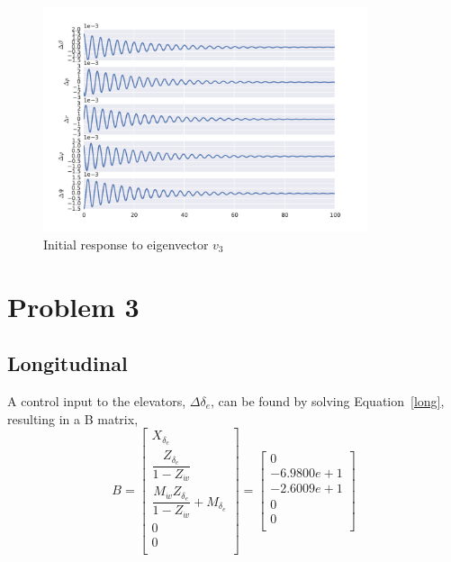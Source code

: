 \documentclass[12pt]{article}
\begin{document}
\begin{figure}[h]
\begin{center}
\includegraphics[width=0.85\textwidth]{figures/LatI4.pdf}
\caption{Initial response to eigenvector $v_3$}
\label{}
\end{center}
\end{figure}

\clearpage
\section{Problem 3}
\subsection{Longitudinal}
A control input to the elevators, $\Delta \delta_e$, can be found by solving Equation~\ref{long}, resulting in a B matrix,
\begin{equation*}
B =
\begin{bmatrix}
   X_{\delta_e} \\
   \dfrac{Z_{\delta_e}}{1-Z_{\dot{w}}} \\
   \dfrac{M_{\dot{w}} Z_{\delta_e}}{1-Z_{\dot{w}}} + M_{\delta_e} \\
   0 \\
   0 \\
\end{bmatrix}
=
\begin{bmatrix}
   0 \\
   -6.9800e+1 \\
   -2.6009e+1 \\
   0 \\
   0 \\
\end{bmatrix}
\end{equation*}
\end{document}
